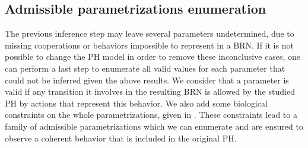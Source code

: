 \begin{comment}
This method sometimes faces cases with opposite effects on a component, leading to either an indeterministic evolution or to oscillations.
Such an indeterminism is not possible in a BRN, and the inference of the targeted parameter is impossible.
In order to avoid such inconclusive cases, one has to ensure that no such behavior is allowed
by either removing undesired actions or using cooperative sorts to prevent opposite influences between regulators.
\end{comment}

\subsection*{Admissible parametrizations enumeration}\label{ssec:admissible-K}

The previous inference step may leave several parameters undetermined, due to missing cooperations or behaviors impossible to represent in a BRN.
If it is not possible to change the PH model in order to remove these inconclusive cases,
one can perform a last step to enumerate all valid values for each parameter that could not be inferred given the above results.
We consider that a parameter is valid if any transition it involves in the resulting BRN is allowed by the studied PH by actions that represent this behavior.
We also add some biological constraints on the whole parametrizations, given in \cite{BernotSemBRN}.
These constraints lead to a family of admissible parametrizations which we can enumerate and are ensured to observe a coherent behavior that is included in the original PH.

\begin{comment}
This approach can be considered as abductive reasoning as some information is added by the enumeration.
If we denote:
\begin{itemize}
  \item $M$ the fact that the behavior of the resulting BRN observes the dynamics of the PH,
  \item $B$ the fact (which is granted) that the IG and the series of necessary parameters inferred from the PH are parts of the resulting BRN,
  \item $H_K$ the hypothesis that $K$ is an admissible complete parametrization,
\end{itemize}
then the parametrizations $K$ that answer our expectations are the ones so that:
\begin{itemize}
  \item $H_K$ is compatible with $B$, that is, all parameters of $K$ are compatible with the inferred parameters,
  \item $B \wedge H_K \models M$, that is, the inferred IG together with $K$ represent a BRN observing the behavior included into the dynamics of the original PH.
\end{itemize}
\end{comment}

